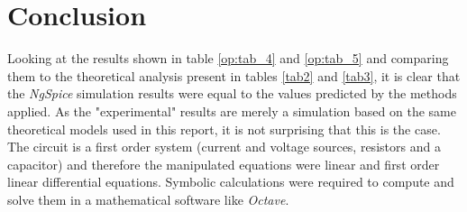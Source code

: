 \section{Conclusion}
\label{sec:conclusion}

Looking at the results shown in table \ref{op:tab_4} and \ref{op:tab_5} and comparing them to the theoretical analysis present in tables \ref{tab2} and \ref{tab3}, it is clear that the \emph{NgSpice} simulation results were equal to the values predicted by the methods applied. As the "experimental" results are merely a simulation based on the same theoretical models used in this report, it is not surprising that this is the case. The circuit is a first order system (current and voltage sources, resistors and a capacitor) and therefore the manipulated equations were linear and first order linear differential equations. Symbolic calculations were required to compute and solve them in a mathematical software like \emph{Octave}. 

